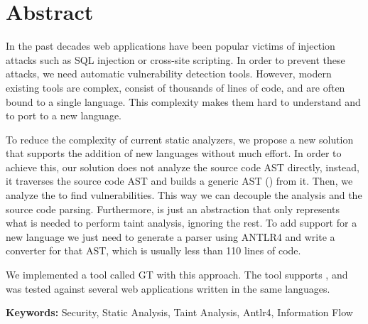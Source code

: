 
\section*{Abstract}


In the past decades web applications have been popular victims of injection attacks such as SQL injection or cross-site scripting. In order to prevent these attacks, we need automatic vulnerability detection tools. However, modern existing tools are complex, consist of thousands of lines of code, and are often bound to a single language. This complexity makes them hard to understand and to port to a new language. 


To reduce the complexity of current static analyzers, we propose a new solution that supports the addition of new languages without much effort. In order to achieve this, our solution does not analyze the source code AST directly, instead, it traverses the source code AST and builds a generic AST (\astname{}) from it. Then, we analyze the \astname{} to find vulnerabilities. This way we can decouple the analysis and the source code parsing. Furthermore, \astname{} is just an abstraction that only represents what is needed to perform taint analysis, ignoring the rest. To add support for a new language we just need to generate a parser using ANTLR4 \cite{antlr4book} and write a converter for that AST, which is usually less than 110 lines of code. 

We implemented a tool called GT with this approach. The tool supports \implangs{}, and was tested against several web applications written in the same languages.
\vfill

\textbf{\Large Keywords:} Security, Static Analysis, Taint Analysis, Antlr4, Information Flow
